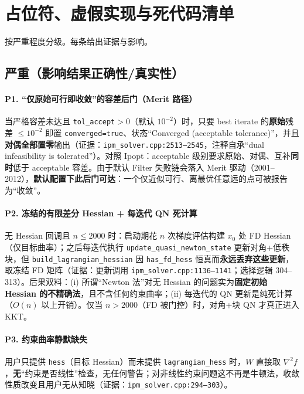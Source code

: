 \documentclass[11pt,a4paper]{ctexart}
\newcommand{\file}[1]{\texttt{#1}}
\newcommand{\func}[1]{\texttt{#1}}
\newcommand{\opt}[1]{\texttt{#1}}
\newcommand{\evid}[1]{{\footnotesize\color{black!70}（证据：#1）}}
\begin{document}
\section{占位符、虚假实现与死代码清单}\label{sec:placeholders}

按严重程度分级。每条给出证据与影响。

\subsection{严重（影响结果正确性/真实性）}

\paragraph{P1. ``仅原始可行即收敛''的容差后门（Merit 路径）}
当严格容差未达且 \opt{tol\_accept}${>}0$（默认 $10^{-2}$）时，只要 best iterate 的\textbf{原始}残差 $\le 10^{-2}$ 即置 \opt{converged=true}、状态``Converged (acceptable tolerance)''，并且\textbf{对偶全部置零}输出\evid{\file{ipm\_solver.cpp:2513--2545}，注释自承``dual infeasibility is tolerated''}。对照 Ipopt：acceptable 级别要求原始、对偶、互补\textbf{同时}低于 acceptable 容差。由于默认 Filter 失败链会落入 Merit 驱动（2001--2012），\textbf{默认配置下此后门可达}：一个仅近似可行、离最优任意远的点可被报告为``收敛''。

\paragraph{P2. 冻结的有限差分 Hessian + 每迭代 QN 死计算}
无 Hessian 回调且 $n\le 2000$ 时：启动期花 $n$ 次梯度评估构建 $x_0$ 处 FD Hessian（仅目标曲率）；之后每迭代执行 \func{update\_quasi\_newton\_state} 更新对角+低秩块，但 \func{build\_lagrangian\_hessian} 因 \opt{has\_fd\_hess} 恒真而\textbf{永远丢弃这些更新}，取冻结 FD 矩阵\evid{更新调用 \file{ipm\_solver.cpp:1136--1141}；选择逻辑 304--313}。后果双料：(i) 所谓``Newton 法''对无 Hessian 的问题实为\textbf{固定初始 Hessian 的不精确法}，且不含任何约束曲率；(ii) 每迭代的 QN 更新是纯死计算（$O(n)$ 以上开销）。仅当 $n>2000$（FD 被门控）时，对角+块 QN 才真正进入 KKT。

\paragraph{P3. 约束曲率静默缺失}
用户只提供 \opt{hess}（目标 Hessian）而未提供 \opt{lagrangian\_hess} 时，$W$ 直接取 $\nabla^2 f$，\textbf{无}``约束是否线性''检查，无任何警告；对非线性约束问题这不再是牛顿法，收敛性质改变且用户无从知晓\evid{\file{ipm\_solver.cpp:294--303}}。
\end{document}
